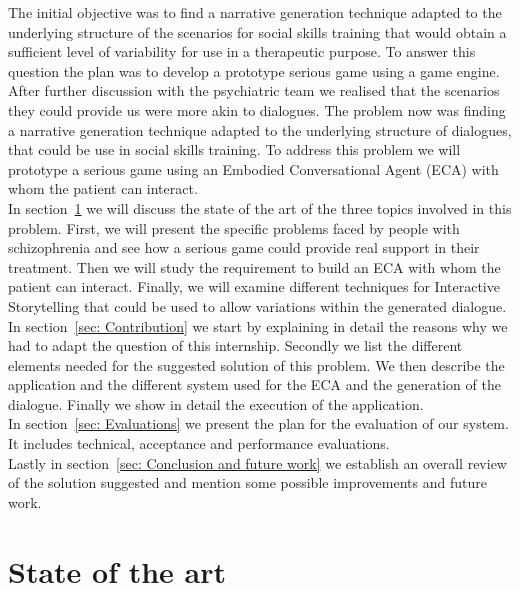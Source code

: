 \documentclass[11pt]{article}
\begin{document}
The initial objective was to find a narrative generation technique adapted to the underlying structure of the scenarios for social skills training that would obtain a sufficient level of variability for use in a therapeutic purpose. To answer this question the plan was to develop a prototype serious game using a game engine.\\

After further discussion with the psychiatric team we realised that the scenarios they could provide us were more akin to dialogues. The problem now was finding a narrative generation technique adapted to the underlying structure of dialogues, that could be use in social skills training. To address this problem we will prototype a serious game using an Embodied Conversational Agent (ECA) with whom the patient can interact.\\

In section~\ref{sec: State of the art} we will discuss the state of the art of the three topics involved in this problem. First, we will present the specific problems faced by people with schizophrenia and see how a serious game could provide real support in their treatment. Then we will study the requirement to build an ECA with whom the patient can interact.  Finally, we will examine different techniques for Interactive Storytelling that could be used to allow variations within the generated dialogue. \\

In section~\ref{sec: Contribution} we start by explaining in detail the reasons why we had to adapt the question of this internship. Secondly we list the different elements needed for the suggested solution of this problem. We then describe the application and the different system used for the ECA and the generation of the dialogue. Finally we show in detail the execution of the application. \\

In section~\ref{sec: Evaluations} we present the plan for the evaluation of our system. It includes technical, acceptance and performance evaluations. \\

Lastly in section~\ref{sec: Conclusion and future work} we establish an overall review of the solution suggested and mention some possible improvements and future work.

\newpage
\section{State of the art} \label{sec: State of the art}
\end{document}
